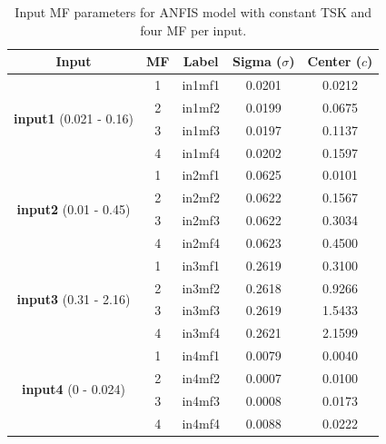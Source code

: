 \documentclass[12pt]{article}
\begin{document}
\begin{table}[H]
\centering
\begin{tabular}{|c|c|c|c|c|}
\hline
\textbf{Input} & \textbf{MF} & \textbf{Label} & \textbf{Sigma ($\sigma$)} & \textbf{Center ($c$)} \\ \hline
\multirow{4}{*}{\textbf{input1} (0.021 - 0.16)} 
 & 1 & in1mf1 & 0.0201 & 0.0212 \\ \cline{2-5} 
 & 2 & in1mf2 & 0.0199 & 0.0675 \\ \cline{2-5} 
 & 3 & in1mf3 & 0.0197 & 0.1137 \\ \cline{2-5} 
 & 4 & in1mf4 & 0.0202 & 0.1597 \\ \hline
\hline
\multirow{4}{*}{\textbf{input2} (0.01 - 0.45)} 
 & 1 & in2mf1 & 0.0625 & 0.0101 \\ \cline{2-5} 
 & 2 & in2mf2 & 0.0622 & 0.1567 \\ \cline{2-5} 
 & 3 & in2mf3 & 0.0622 & 0.3034 \\ \cline{2-5} 
 & 4 & in2mf4 & 0.0623 & 0.4500 \\ \hline
\hline
\multirow{4}{*}{\textbf{input3} (0.31 - 2.16)} 
 & 1 & in3mf1 & 0.2619 & 0.3100 \\ \cline{2-5} 
 & 2 & in3mf2 & 0.2618 & 0.9266 \\ \cline{2-5} 
 & 3 & in3mf3 & 0.2619 & 1.5433 \\ \cline{2-5} 
 & 4 & in3mf4 & 0.2621 & 2.1599 \\ \hline
\hline
\multirow{4}{*}{\textbf{input4} (0 - 0.024)} 
 & 1 & in4mf1 & 0.0079 & 0.0040 \\ \cline{2-5} 
 & 2 & in4mf2 & 0.0007 & 0.0100 \\ \cline{2-5} 
 & 3 & in4mf3 & 0.0008 & 0.0173 \\ \cline{2-5} 
 & 4 & in4mf4 & 0.0088 & 0.0222 \\ \hline
\end{tabular}
\caption{Input MF parameters for ANFIS model with constant TSK and four MF per input. }
\end{table}
\end{document}

